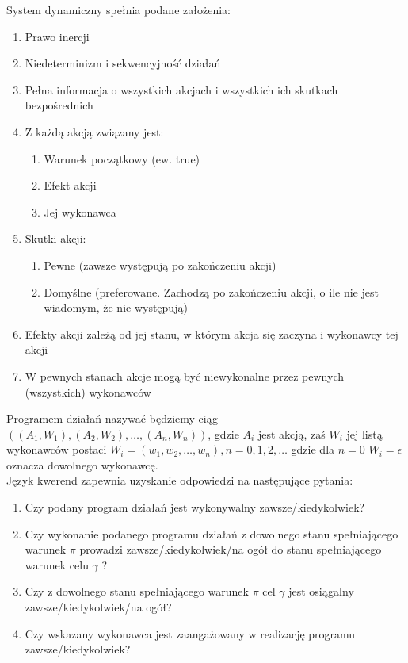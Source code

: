 \documentclass{article}
\begin{document}
System dynamiczny spełnia podane założenia:
\begin{enumerate}
\item Prawo inercji
\item Niedeterminizm i sekwencyjność działań
\item Pełna informacja o wszystkich akcjach i wszystkich ich skutkach bezpośrednich
\item Z każdą akcją związany jest:
\begin{enumerate}
\item Warunek początkowy (ew. true)
\item Efekt akcji
\item Jej wykonawca
\end{enumerate}
\item Skutki akcji:
\begin{enumerate}
\item Pewne (zawsze występują po zakończeniu akcji)
\item Domyślne (preferowane. Zachodzą po zakończeniu akcji, o ile nie jest wiadomym, że nie występują)
\end{enumerate}
\item Efekty akcji zależą od jej stanu, w którym akcja się zaczyna i wykonawcy tej akcji
\item W pewnych stanach akcje mogą być niewykonalne przez pewnych (wszystkich) wykonawców
\end{enumerate}

Programem działań nazywać będziemy ciąg $((A_{1},W_{1}), (A_{2},W_{2}), …, (A_{n},W_{n}))$, 
gdzie $A_{i}$ jest akcją, zaś $W_{i}$ jej listą wykonawców postaci $W_{i} = (w_{1}, w_{2}, \dots, w_{n}), n = 0, 1, 2, \dots$ gdzie dla $n = 0$ $W_{i} = \epsilon$ oznacza dowolnego wykonawcę.\\


Język kwerend zapewnia uzyskanie odpowiedzi na następujące pytania:
\begin{enumerate}
\item Czy podany program działań jest wykonywalny zawsze/kiedykolwiek?
\item Czy wykonanie podanego programu działań z dowolnego stanu spełniającego warunek $\pi$ prowadzi zawsze/kiedykolwiek/na ogół do stanu spełniającego warunek celu $\gamma$ ?
\item Czy z dowolnego stanu spełniającego warunek $\pi$ cel $\gamma$ jest osiągalny zawsze/kiedykolwiek/na ogół?
\item Czy wskazany wykonawca jest zaangażowany w realizację programu zawsze/kiedykolwiek?
\end{enumerate}
\end{document}
